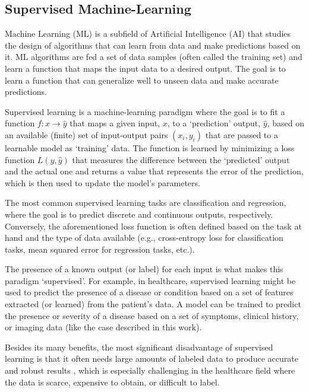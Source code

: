 \documentclass[../main.tex]{subfiles}
\begin{document}
    \subsection{Supervised Machine-Learning} \label{sec:supervised_ml}

    Machine Learning (ML) is a subfield of Artificial Intelligence (AI) that studies the design of algorithms that can learn from data and make predictions based on it. ML algorithms are fed a set of data samples (often called the training set) and learn a function that maps the input data to a desired output. The goal is to learn a function that can generalize well to unseen data and make accurate predictions. 

    Supervised learning is a machine-learning paradigm where the goal is to fit a function $f: x \rightarrow \hat{y}$ that maps a given input, $x$, to a `prediction' output, $\hat{y}$, based on an available (finite) set of input-output pairs $(x_i, y_i)$ that are passed to a learnable model as `training' data. The function is learned by minimizing a loss function $L(y, \hat{y})$ that measures the difference between the `predicted' output and the actual one and returns a value that represents the error of the prediction, which is then used to update the model's parameters.

    The most common supervised learning tasks are classification and regression, where the goal is to predict discrete and continuous outputs, respectively. Conversely, the aforementioned loss function is often defined based on the task at hand and the type of data available (e.g., cross-entropy loss for classification tasks, mean squared error for regression tasks, etc.).

    The presence of a known output (or label) for each input is what makes this paradigm `supervised'. For example, in healthcare, supervised learning might be used to predict the presence of a disease or condition based on a set of features extracted (or learned) from the patient's data. A model can be trained to predict the presence or severity of a disease based on a set of symptoms, clinical history, or imaging data (like the case described in this work).

    Besides its many benefits, the most significant disadvantage of supervised learning is that it often needs large amounts of labeled data to produce accurate and robust results \cite{lecun_deep_2015}, which is especially challenging in the healthcare field where the data is scarce, expensive to obtain, or difficult to label.
\end{document}
